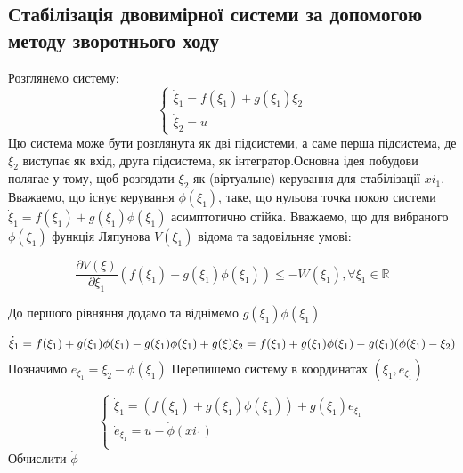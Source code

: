 \documentclass{article}
\begin{document}
\subsection{Стабілізація двовимірної системи за допомогою методу зворотнього ходу}
Розглянемо систему:
\begin{equation}
	\begin{cases}
		\dot \xi_1 = f(\xi_1) + g(\xi_1)\xi_2 \\
		\dot\xi_2 = u
	\end{cases}
\end{equation}
Цю система може бути розглянута як дві підсистеми, а саме перша підсистема, де $\xi_2$ виступає як вхід, друга
підсистема, як інтегратор.Основна ідея побудови полягае у тому, щоб розгядати $\xi_2$ як (віртуальне) керування для
стабілізації $xi_1$. Вважаемо, що існує керування $\phi(\xi_1)$, таке, що нульова точка покою
системи $\dot \xi_1 = f(\xi_1) + g(\xi_1)\phi(\xi_1)$
асимптотично стійка.
Вважаемо, що для вибраного $\phi(\xi_1)$ функція Ляпунова $V(\xi_1)$  відома та задовільняє умові:

\begin{equation}
    \frac{\partial V(\xi)}{\partial \xi_1}(f(\xi_1)+g(\xi_1)\phi(\xi_1)) \leq
    -W(\xi_1), \forall \xi_1 \in \mathbb{R}
\end{equation}

До першого рівняння додамо та віднімемо $g(\xi_1)\phi(\xi_1)$

\begin{equation}
\dot\xi_1 = f(\xi_1)+g(\xi_1)\phi(\xi_1)-g(\xi_1)\phi(\xi_1)+g(\xi)\xi_2 =\\
f(\xi_1)+g(\xi_1)\phi(\xi_1)-g(\xi_1)(\phi(\xi_1)-\xi_2)
\end{equation}
Позначимо $e_{\xi_1} = \xi_2-\phi(\xi_1)$
Перепишемо систему в координатах $(\xi_1, e_{\xi_1})$

\begin{equation}
    \begin{cases}
    \dot \xi_1 = (f(\xi_1)+g(\xi_1)\phi(\xi_1))+g(\xi_1)e_{\xi_1}\\
    \dot e_{\xi_1} = u-\dot \phi(xi_1)\\  
    \end{cases}
\end{equation}
Обчислити $\dot\phi$ 
\end{document}
